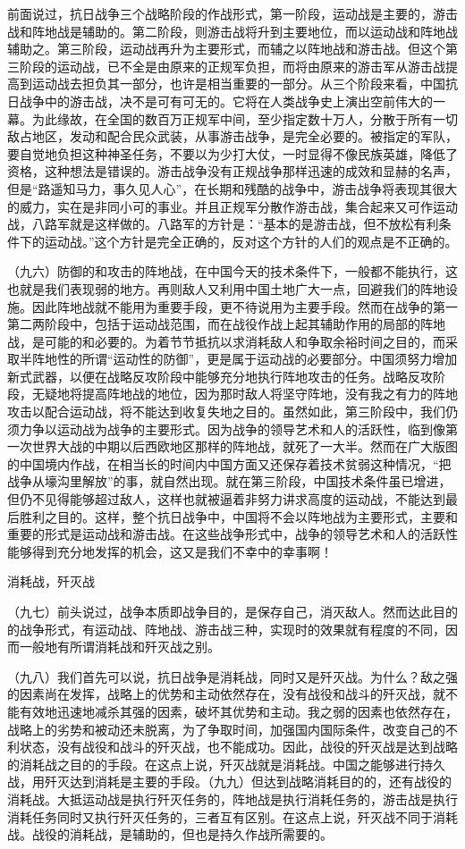 \documentclass[UTF8, 12pt, a4paper]{ctexrep}
\begin{document}
前面说过，抗日战争三个战略阶段的作战形式，第一阶段，运动战是主要的，游击战和阵地战是辅助的。第二阶段，则游击战将升到主要地位，而以运动战和阵地战辅助之。第三阶段，运动战再升为主要形式，而辅之以阵地战和游击战。但这个第三阶段的运动战，已不全是由原来的正规军负担，而将由原来的游击军从游击战提高到运动战去担负其一部分，也许是相当重要的一部分。从三个阶段来看，中国抗日战争中的游击战，决不是可有可无的。它将在人类战争史上演出空前伟大的一幕。为此缘故，在全国的数百万正规军中间，至少指定数十万人，分散于所有一切敌占地区，发动和配合民众武装，从事游击战争，是完全必要的。被指定的军队，要自觉地负担这种神圣任务，不要以为少打大仗，一时显得不像民族英雄，降低了资格，这种想法是错误的。游击战争没有正规战争那样迅速的成效和显赫的名声，但是“路遥知马力，事久见人心”，在长期和残酷的战争中，游击战争将表现其很大的威力，实在是非同小可的事业。并且正规军分散作游击战，集合起来又可作运动战，八路军就是这样做的。八路军的方针是：“基本的是游击战，但不放松有利条件下的运动战。”这个方针是完全正确的，反对这个方针的人们的观点是不正确的。

（九六）防御的和攻击的阵地战，在中国今天的技术条件下，一般都不能执行，这也就是我们表现弱的地方。再则敌人又利用中国土地广大一点，回避我们的阵地设施。因此阵地战就不能用为重要手段，更不待说用为主要手段。然而在战争的第一第二两阶段中，包括于运动战范围，而在战役作战上起其辅助作用的局部的阵地战，是可能的和必要的。为着节节抵抗以求消耗敌人和争取余裕时间之目的，而采取半阵地性的所谓“运动性的防御”，更是属于运动战的必要部分。中国须努力增加新式武器，以便在战略反攻阶段中能够充分地执行阵地攻击的任务。战略反攻阶段，无疑地将提高阵地战的地位，因为那时敌人将坚守阵地，没有我之有力的阵地攻击以配合运动战，将不能达到收复失地之目的。虽然如此，第三阶段中，我们仍须力争以运动战为战争的主要形式。因为战争的领导艺术和人的活跃性，临到像第一次世界大战的中期以后西欧地区那样的阵地战，就死了一大半。然而在广大版图的中国境内作战，在相当长的时间内中国方面又还保存着技术贫弱这种情况，“把战争从壕沟里解放”的事，就自然出现。就在第三阶段，中国技术条件虽已增进，但仍不见得能够超过敌人，这样也就被逼着非努力讲求高度的运动战，不能达到最后胜利之目的。这样，整个抗日战争中，中国将不会以阵地战为主要形式，主要和重要的形式是运动战和游击战。在这些战争形式中，战争的领导艺术和人的活跃性能够得到充分地发挥的机会，这又是我们不幸中的幸事啊！

消耗战，歼灭战

（九七）前头说过，战争本质即战争目的，是保存自己，消灭敌人。然而达此目的的战争形式，有运动战、阵地战、游击战三种，实现时的效果就有程度的不同，因而一般地有所谓消耗战和歼灭战之别。

（九八）我们首先可以说，抗日战争是消耗战，同时又是歼灭战。为什么？敌之强的因素尚在发挥，战略上的优势和主动依然存在，没有战役和战斗的歼灭战，就不能有效地迅速地减杀其强的因素，破坏其优势和主动。我之弱的因素也依然存在，战略上的劣势和被动还未脱离，为了争取时间，加强国内国际条件，改变自己的不利状态，没有战役和战斗的歼灭战，也不能成功。因此，战役的歼灭战是达到战略的消耗战之目的的手段。在这点上说，歼灭战就是消耗战。中国之能够进行持久战，用歼灭达到消耗是主要的手段。（九九）但达到战略消耗目的的，还有战役的消耗战。大抵运动战是执行歼灭任务的，阵地战是执行消耗任务的，游击战是执行消耗任务同时又执行歼灭任务的，三者互有区别。在这点上说，歼灭战不同于消耗战。战役的消耗战，是辅助的，但也是持久作战所需要的。
\end{document}
